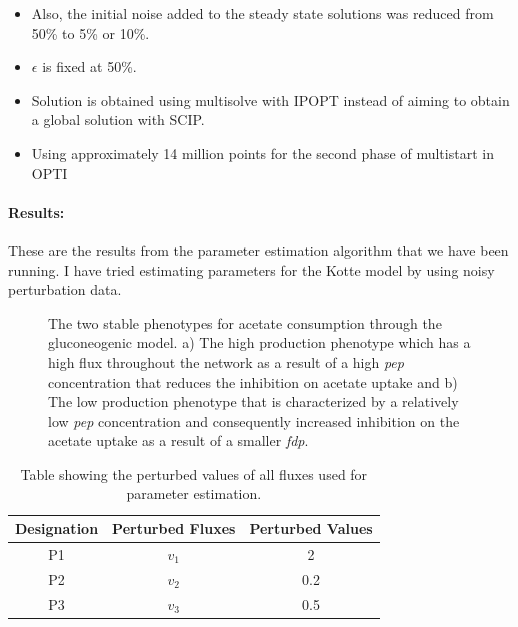\documentclass[10pt]{report}
\begin{document}
	\begin{itemize}
		\item Also, the initial noise added to the steady state solutions was reduced from 50\% to 5\% or 10\%.
		\item $\epsilon$ is fixed at 50\%.
		\item Solution is obtained using multisolve with IPOPT instead of aiming to obtain a global solution with SCIP.
		\item Using approximately 14 million points for the second phase of multistart in OPTI
	\end{itemize}

	\paragraph{Results:}
	These are the results from the parameter estimation algorithm that we have been running. I have tried estimating parameters for the Kotte model by using noisy perturbation data.
	
	\begin{figure}[!h]%
		\caption{The two stable phenotypes for acetate consumption through the gluconeogenic model. a) The high production phenotype which has a high flux throughout the network as a result of a high \textit{pep} concentration that reduces the inhibition on acetate uptake and b) The low production phenotype that is characterized by a relatively low \textit{pep} concentration and consequently increased inhibition on the acetate uptake as a result of a smaller \textit{fdp}.}\label{fig:fig1}
	\end{figure}

	\begin{table}[!tbhp]
		\caption{Table showing the perturbed values of all fluxes used for parameter estimation.}
		\begin{center}				
			\begin{tabular}{ccc}
				Designation & Perturbed Fluxes & Perturbed Values\\
				\hline
				P1 & $v_1$ & 2\\
				P2 & $v_2$ & 0.2\\
				P3 & $v_3$ & 0.5
			\end{tabular}
		\end{center}	
	\label{tab:pval}
	\end{table}
	
\end{document}
